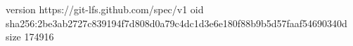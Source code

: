 version https://git-lfs.github.com/spec/v1
oid sha256:2be3ab2727c839194f7d808d0a79c4dc1d3e6e180f88b9b5d57faaf54690340d
size 174916
